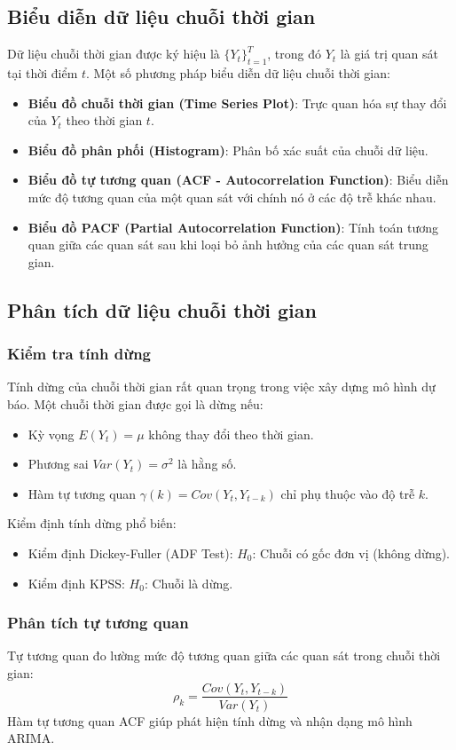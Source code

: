 \subsection{Biểu diễn dữ liệu chuỗi thời gian}
Dữ liệu chuỗi thời gian được ký hiệu là $\{Y_t\}_{t=1}^{T}$, trong đó $Y_t$ là giá trị quan sát tại thời điểm $t$. Một số phương pháp biểu diễn dữ liệu chuỗi thời gian:
\begin{itemize}
    \item \textbf{Biểu đồ chuỗi thời gian (Time Series Plot)}: Trực quan hóa sự thay đổi của $Y_t$ theo thời gian $t$.
    \item \textbf{Biểu đồ phân phối (Histogram)}: Phân bố xác suất của chuỗi dữ liệu.
    \item \textbf{Biểu đồ tự tương quan (ACF - Autocorrelation Function)}: Biểu diễn mức độ tương quan của một quan sát với chính nó ở các độ trễ khác nhau.
    \item \textbf{Biểu đồ PACF (Partial Autocorrelation Function)}: Tính toán tương quan giữa các quan sát sau khi loại bỏ ảnh hưởng của các quan sát trung gian.
\end{itemize}

\subsection{Phân tích dữ liệu chuỗi thời gian}
\subsubsection{Kiểm tra tính dừng}
Tính dừng của chuỗi thời gian rất quan trọng trong việc xây dựng mô hình dự báo. Một chuỗi thời gian được gọi là dừng nếu:
\begin{itemize}
    \item Kỳ vọng $E(Y_t) = \mu$ không thay đổi theo thời gian.
    \item Phương sai $Var(Y_t) = \sigma^2$ là hằng số.
    \item Hàm tự tương quan $\gamma(k) = Cov(Y_t, Y_{t-k})$ chỉ phụ thuộc vào độ trễ $k$.
\end{itemize}
Kiểm định tính dừng phổ biến:
\begin{itemize}
    \item Kiểm định Dickey-Fuller (ADF Test): $H_0$: Chuỗi có gốc đơn vị (không dừng).
    \item Kiểm định KPSS: $H_0$: Chuỗi là dừng.
\end{itemize}

\subsubsection{Phân tích tự tương quan}
Tự tương quan đo lường mức độ tương quan giữa các quan sát trong chuỗi thời gian:
\begin{equation}
    \rho_k = \frac{Cov(Y_t, Y_{t-k})}{Var(Y_t)}
\end{equation}
Hàm tự tương quan ACF giúp phát hiện tính dừng và nhận dạng mô hình ARIMA.


